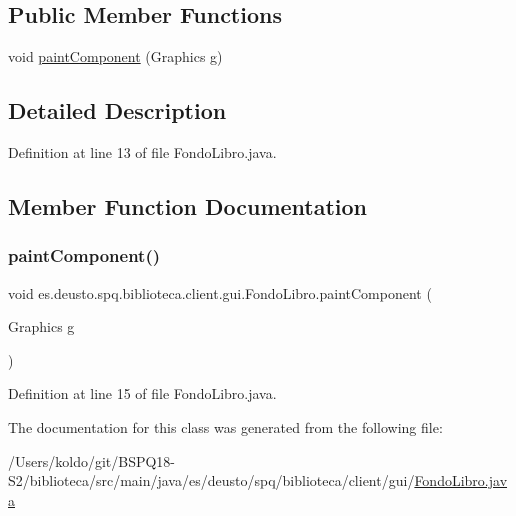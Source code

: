 \subsection*{Public Member Functions}
\begin{DoxyCompactItemize}
\item 
void \mbox{\hyperlink{classes_1_1deusto_1_1spq_1_1biblioteca_1_1client_1_1gui_1_1_fondo_libro_ace9f012294362dac9d16fb3876527435}{paint\+Component}} (Graphics g)
\end{DoxyCompactItemize}


\subsection{Detailed Description}


Definition at line 13 of file Fondo\+Libro.\+java.



\subsection{Member Function Documentation}
\mbox{\label{classes_1_1deusto_1_1spq_1_1biblioteca_1_1client_1_1gui_1_1_fondo_libro_ace9f012294362dac9d16fb3876527435}} 
\subsubsection{\texorpdfstring{paint\+Component()}{paintComponent()}}
{\footnotesize\ttfamily void es.\+deusto.\+spq.\+biblioteca.\+client.\+gui.\+Fondo\+Libro.\+paint\+Component (\begin{DoxyParamCaption}\item[{Graphics}]{g }\end{DoxyParamCaption})}



Definition at line 15 of file Fondo\+Libro.\+java.



The documentation for this class was generated from the following file\+:\begin{DoxyCompactItemize}
\item 
/\+Users/koldo/git/\+B\+S\+P\+Q18-\/\+S2/biblioteca/src/main/java/es/deusto/spq/biblioteca/client/gui/\mbox{\hyperlink{_fondo_libro_8java}{Fondo\+Libro.\+java}}\end{DoxyCompactItemize}
